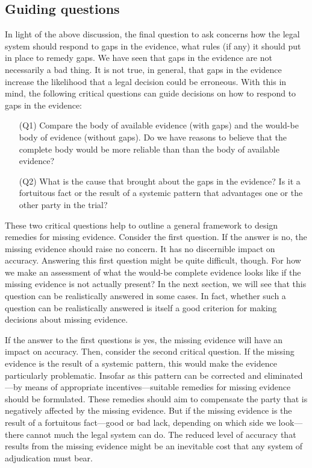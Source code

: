 \documentclass[
  10pt,
  dvipsnames,enabledeprecatedfontcommands]{scrartcl}
\begin{document}
\hypertarget{guiding-questions}{%
\subsection{Guiding questions}\label{guiding-questions}}

In light of the above discussion, the final question to ask concerns how
the legal system should respond to gaps in the evidence, what rules (if
any) it should put in place to remedy gaps. We have seen that gaps in
the evidence are not necessarily a bad thing. It is not true, in
general, that gaps in the evidence increase the likelihood that a legal
decision could be erroneous. With this in mind, the following critical
questions can guide decisions on how to respond to gaps in the evidence:

\begin{itemize}

\item[(Q1)] Compare the body of available evidence (with gaps) and the would-be body of evidence (without gaps). Do we have reasons to believe that the complete body would be more reliable than than the body of available evidence? 

\item[(Q2)] What is the cause that brought about the gaps in the evidence? Is it a fortuitous fact or the result of a systemic pattern that advantages one or the other party in the trial? 

\end{itemize}

These two critical questions help to outline a general framework to
design remedies for missing evidence. Consider the first question. If
the answer is no, the missing evidence should raise no concern. It has
no discernible impact on accuracy. Answering this first question might
be quite difficult, though. For how we make an assessment of what the
would-be complete evidence looks like if the missing evidence is not
actually present? In the next section, we will see that this question
can be realistically answered in some cases. In fact, whether such a
question can be realistically answered is itself a good criterion for
making decisions about missing evidence.

If the answer to the first questions is yes, the missing evidence will
have an impact on accuracy. Then, consider the second critical question.
If the missing evidence is the result of a systemic pattern, this would
make the evidence particularly problematic. Insofar as this pattern can
be corrected and eliminated---by means of appropriate
incentives---suitable remedies for missing evidence should be
formulated. These remedies should aim to compensate the party that is
negatively affected by the missing evidence. But if the missing evidence
is the result of a fortuitous fact---good or bad lack, depending on
which side we look---there cannot much the legal system can do. The
reduced level of accuracy that results from the missing evidence might
be an inevitable cost that any system of adjudication must bear.
\end{document}
